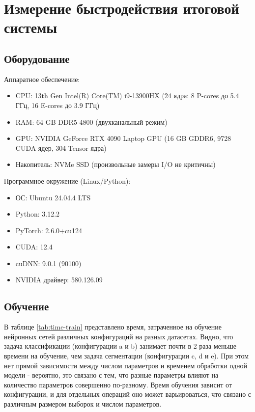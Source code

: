 
\section{Измерение быстродействия итоговой системы}

\subsection{Оборудование}

Аппаратное обеспечение:

\begin{itemize}
    \item CPU: 13th Gen Intel(R) Core(TM) i9-13900HX (24 ядра: 8 P-cores до 5.4 ГГц, 16 E-cores до 3.9 ГГц)
    \item RAM: 64 GB DDR5-4800 (двухканальный режим)
    \item GPU: NVIDIA GeForce RTX 4090 Laptop GPU (16 GB GDDR6, 9728 CUDA ядер, 304 Tensor ядра)
    \item Накопитель: NVMe SSD (произвольные замеры I/O не критичны)
\end{itemize}

Программное окружение (Linux/Python):

\begin{itemize}
    \item ОС: Ubuntu 24.04.4 LTS
    \item Python: 3.12.2
    \item PyTorch: 2.6.0+cu124
    \item CUDA: 12.4
    \item cuDNN: 9.0.1 (90100)
    \item NVIDIA драйвер: 580.126.09
\end{itemize}



\subsection{Обучение}

В таблице \ref{tab:time-train} представлено время, затраченное на обучение нейронных сетей различных конфигураций на разных датасетах. Видно, что задача классификации (конфигурации a и b) занимает почти в 2 раза меньше времени на обучение, чем задача сегментации (конфигурации c, d и e). При этом нет прямой зависимости между числом параметров и временем обработки одной модели - вероятно, это связано с тем, что разные параметры влияют на количество параметров совершенно по-разному. Время обучения зависит от конфигурации, и для отдельных операций оно может варьироваться, что связано с различным размером выборок и числом параметров.

